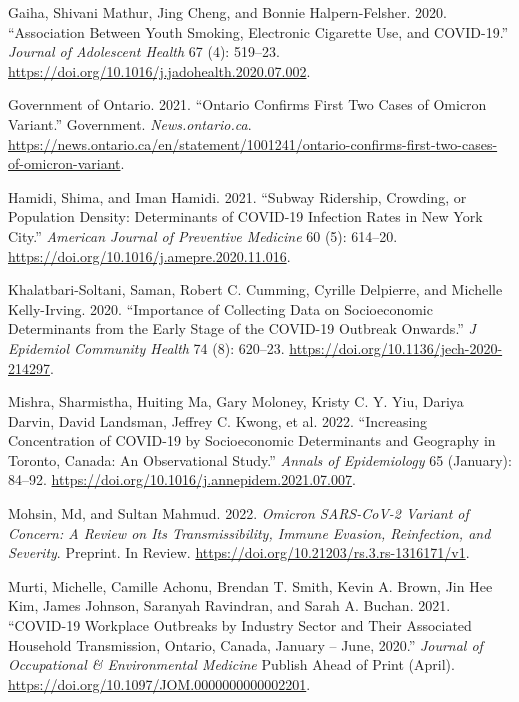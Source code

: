 \documentclass[]{article}
\newenvironment{CSLReferences}%
  {}%
  {\par}
\begin{document}
\begin{CSLReferences}{1}{0}
\leavevmode{}%
Gaiha, Shivani Mathur, Jing Cheng, and Bonnie Halpern-Felsher. 2020.
{``Association Between Youth Smoking, Electronic Cigarette Use, and
COVID-19.''} \emph{Journal of Adolescent Health} 67 (4): 519--23.
\url{https://doi.org/10.1016/j.jadohealth.2020.07.002}.

\leavevmode{}%
Government of Ontario. 2021. {``Ontario Confirms First Two Cases of
Omicron Variant.''} Government. \emph{News.ontario.ca}.
\url{https://news.ontario.ca/en/statement/1001241/ontario-confirms-first-two-cases-of-omicron-variant}.

\leavevmode{}%
Hamidi, Shima, and Iman Hamidi. 2021. {``Subway Ridership, Crowding, or
Population Density: Determinants of COVID-19 Infection Rates in New York
City.''} \emph{American Journal of Preventive Medicine} 60 (5): 614--20.
\url{https://doi.org/10.1016/j.amepre.2020.11.016}.

\leavevmode{}%
Khalatbari-Soltani, Saman, Robert C. Cumming, Cyrille Delpierre, and
Michelle Kelly-Irving. 2020. {``Importance of Collecting Data on
Socioeconomic Determinants from the Early Stage of the COVID-19 Outbreak
Onwards.''} \emph{J Epidemiol Community Health} 74 (8): 620--23.
\url{https://doi.org/10.1136/jech-2020-214297}.

\leavevmode{}%
Mishra, Sharmistha, Huiting Ma, Gary Moloney, Kristy C. Y. Yiu, Dariya
Darvin, David Landsman, Jeffrey C. Kwong, et al. 2022. {``Increasing
Concentration of COVID-19 by Socioeconomic Determinants and Geography in
Toronto, Canada: An Observational Study.''} \emph{Annals of
Epidemiology} 65 (January): 84--92.
\url{https://doi.org/10.1016/j.annepidem.2021.07.007}.

\leavevmode{}%
Mohsin, Md, and Sultan Mahmud. 2022. \emph{Omicron SARS-CoV-2 Variant of
Concern: A Review on Its Transmissibility, Immune Evasion, Reinfection,
and Severity}. Preprint. In Review.
\url{https://doi.org/10.21203/rs.3.rs-1316171/v1}.

\leavevmode{}%
Murti, Michelle, Camille Achonu, Brendan T. Smith, Kevin A. Brown, Jin
Hee Kim, James Johnson, Saranyah Ravindran, and Sarah A. Buchan. 2021.
{``COVID-19 Workplace Outbreaks by Industry Sector and Their Associated
Household Transmission, Ontario, Canada, January -- June, 2020.''}
\emph{Journal of Occupational \& Environmental Medicine} Publish Ahead
of Print (April). \url{https://doi.org/10.1097/JOM.0000000000002201}.


\end{CSLReferences}
\end{document}

